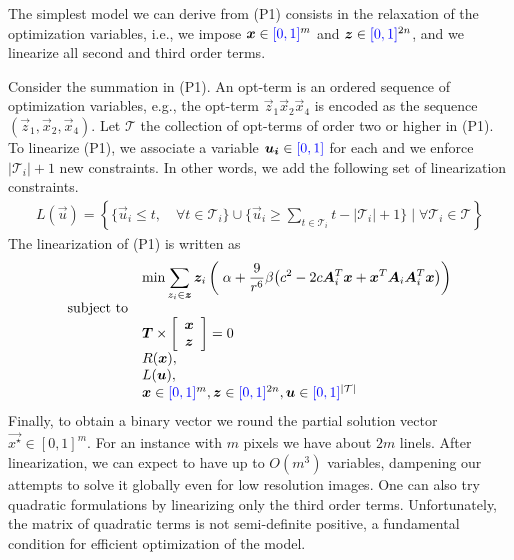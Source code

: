 	The simplest model we can derive from (P1) consists in the relaxation of the optimization variables, i.e., we impose $\bm{x} \in {\color{blue}{[0,1]}}^m$ and $\bm{z} \in {\color{blue}{[0,1]}}^{2n}$, and we linearize all second and third order terms. 
	
	Consider the summation in (P1). An opt-term is an ordered sequence of optimization variables, e.g., the opt-term $\vec{z}_1\vec{x}_2\vec{x}_4$ is encoded as the sequence $(\vec{z}_1,\vec{x}_2,\vec{x}_4)$. Let $\mathcal{T}$ the collection of opt-terms of order two or higher in (P1). To linearize (P1), we associate a variable $\bm{u_i} \in {\color{blue}{[0,1]}}$ for each  and we enforce $|\mathcal{T}_i|+1$ new constraints. In other words, we add the following set of linearization constraints.
\begin{align*}
	L(\vec{u}) = \left\{ \Big\{ \vec{u}_i \leq t, \quad \forall t \in \mathcal{T}_i \Big\} \cup \Big\{ \vec{u}_i \geq \displaystyle \sum_{t \in \mathcal{T}_i}{t} - |\mathcal{T}_i| + 1 \Big\} \; \Big| \; \forall \mathcal{T}_i \in \mathcal{T} \right\}
\end{align*}
%
%
%
The linearization of (P1) is written as
\begin{align*}
\begin{array}{ll}
& \displaystyle	\min \sum_{z_i \in \bm{z}}{ \bm{z}_i \left(\; \alpha + \frac{9}{r^6}\beta \big(c^2 - 2c\bm{A}_i^T\bm{x} + \bm{x}^T\bm{A}_i\bm{A}_i^T\bm{x}\big)\right)} \\
\text{subject to}\\
&	\bm{T} \times  \left[ \begin{array}{c}
							\bm{x} \\ 
							\bm{z} 
						   \end{array} \right] = 0 \\
&   R(\bm{x}),\\
&   L(\bm{u}),\\
&   \bm{x} \in {\color{blue}{[0,1]}}^{m}, \bm{z} \in {\color{blue}{[0,1]}}^{2n}, \bm{u} \in {\color{blue}{[0,1]}}^{|\mathcal{T}|} 
\end{array}
\end{align*}
%
	Finally, to obtain a binary vector we round the partial solution vector $\vec{x^{\star}} \in [0,1]^m$. For an instance with $m$ pixels we have about $2m$ linels. After linearization, we can expect to have up to $O(m^3)$ variables, dampening our attempts to solve it globally even for low resolution images. One can also try quadratic formulations by linearizing only the third order terms. Unfortunately, the matrix of quadratic terms is not semi-definite positive, a fundamental condition for efficient optimization of the model.
	


